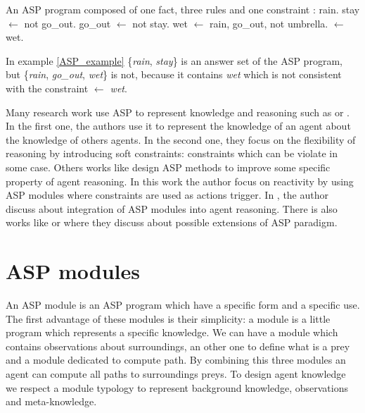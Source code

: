 \documentclass{aamas2012}
\begin{document}
	\begin{example}
		\label{ASP_example}
		An ASP program composed of one fact, three rules and one constraint :\newline
		\newline
		rain.\newline
		stay $\leftarrow$ not go\_out.\newline
		go\_out $\leftarrow$ not stay.\newline
		wet $\leftarrow$ rain, go\_out, not umbrella.\newline
		$\leftarrow$ wet.
	\end{example}
	
	In example \ref{ASP_example} \{\emph{rain}, \emph{stay}\} is an answer set of the ASP program, but \{\emph{rain}, \emph{go\_out}, \emph{wet}\} is not, 
	because it contains \emph{wet} which is not consistent with the constraint \emph{$\leftarrow$ wet}.
	
	Many research work use ASP to represent knowledge and reasoning such as \cite{DBLP:conf/atal/BaralGSP10} or \cite{DBLP:conf/clima/NieuwenborghVHV06}.
	In the first one, the authors use it to represent the knowledge of an agent about the knowledge of others agents.
	In the second one, they focus on the flexibility of reasoning by introducing soft constraints: constraints which can be violate in some case.
	Others works like \cite{DBLP:conf/datalog/Costantini10} design ASP methods to improve some specific property of agent reasoning.
	In this work the author focus on reactivity by using ASP modules where constraints are used as actions trigger.
	In \cite{DBLP:conf/lpnmr/Costantini09}, the author discuss about integration of ASP modules into agent reasoning.
	There is also works like \cite{DBLP:conf/aaaiss/BaralAD06} or \cite{DBLP:conf/birthday/FaberW11} where they discuss about possible extensions of ASP paradigm.

\section{ASP modules}

	An ASP module is an ASP program which have a specific form and a specific use.
	The first advantage of these modules is their simplicity: a module is a little program which represents a specific knowledge.
	We can have a module which contains observations about surroundings,
	an other one to define what is a prey and a module dedicated to compute path.
	By combining this three modules an agent can compute all paths to surroundings preys.
	To design agent knowledge we respect a module typology to represent background knowledge, observations and meta-knowledge.
\end{document}

